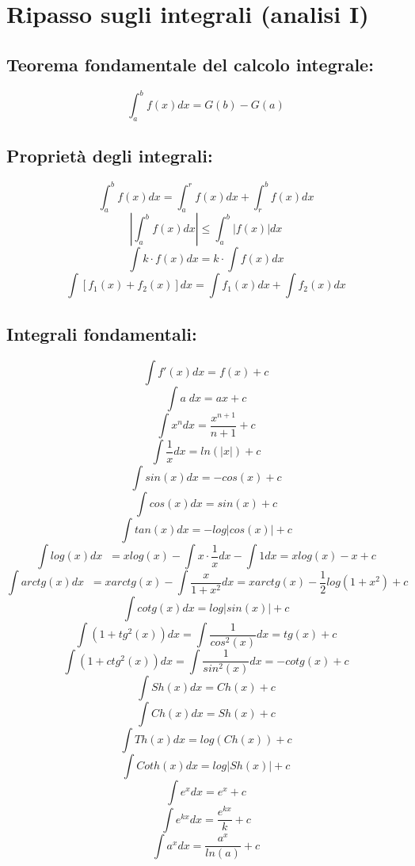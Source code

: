\section{Ripasso sugli integrali (analisi I)}
\subsection{Teorema fondamentale del calcolo integrale:}
\[
    \int_{a}^{b} f(x) dx = G(b) - G(a)
\]
\subsection{Proprietà degli integrali:}
\[
    \int_{a}^{b} f(x)dx = \int_{a}^{r} f(x) dx + \int_{r}^{b} f(x) dx
\]
\[
    \left| \int_{a}^{b} f(x) dx \right| \leq \int_{a}^{b} |f(x)| dx
\]
\[
    \int k \cdot f(x) dx = k \cdot \int f(x) dx
\]
\[
    \int [f_1(x) + f_2(x) ] dx= \int f_1(x) dx + \int f_2(x) dx
\]
\subsection{Integrali fondamentali:}
\[
    \int f'(x) dx = f(x) +c
\]
\[
    \int a \; dx = ax +c
\]
\[
    \int x^n dx = \frac{x^{n+1}}{n+1} +c
\]
\[
    \int \frac{1}{x}dx = ln(|x|) +c
\]
\[
    \int sin(x) dx = -cos(x) +c
\]
\[
    \int cos(x) dx = sin(x)+c
\]
\[
    \int tan(x) dx = -log|cos(x)| +c
\]
\[
    \int log(x) dx \;\; = xlog(x) - \int x \cdot  \frac{1}{x} dx - \int 1 dx = x log(x) -x + c
\]
\[
    \int arctg (x) dx \;\; = x arctg(x) -\int \frac{x}{1+x^2}dx = x arctg(x) -\frac{1}{2}log(1+x^2) + c 
\]
\[
    \int cotg(x) dx = log|sin(x)| +c
\]
\[
    \int (1+tg^2(x))dx = \int \frac{1}{cos^2(x)} dx = tg(x) +c
\]
\[
    \int (1+ctg^2(x))dx = \int \frac{1}{sin^2(x)} dx = -cotg(x) +c
\]
\[
    \int Sh(x) dx = Ch(x) +c
\]
\[
    \int Ch(x) dx = Sh(x) +c
\]
\[
    \int Th(x) dx = log(Ch(x))+c
\]
\[
    \int Coth(x) dx = log|Sh(x)| +c
\]
\[
    \int e^x dx = e^x+c
\]
\[
    \int e^{kx} dx = \frac{e^{kx}}{k} +c
\]
\[
    \int a^x dx = \frac{a^x}{ln(a)}+c
\]
